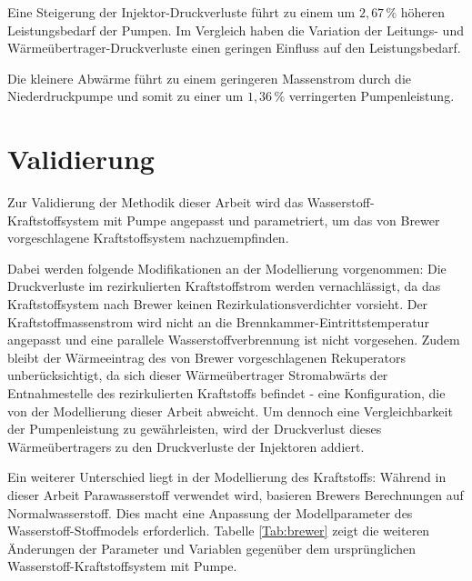 Eine Steigerung der Injektor-Druckverluste führt zu einem um $2,67\,\%$ höheren Leistungsbedarf der Pumpen. Im Vergleich haben die Variation der Leitungs- und Wärmeübertrager-Druckverluste einen geringen Einfluss auf den Leistungsbedarf. 

Die kleinere Abwärme führt zu einem geringeren Massenstrom durch die Niederdruckpumpe und somit zu einer um $1,36\,\%$ verringerten Pumpenleistung.

\section{Validierung}

Zur Validierung der Methodik dieser Arbeit wird das Wasserstoff-Kraftstoffsystem mit Pumpe angepasst und parametriert, um das von Brewer \cite{Brewer.1991} vorgeschlagene Kraftstoffsystem nachzuempfinden. 

Dabei werden folgende Modifikationen an der Modellierung vorgenommen: Die Druckverluste im rezirkulierten Kraftstoffstrom werden vernachlässigt, da das Kraftstoffsystem nach Brewer keinen Rezirkulationsverdichter vorsieht. Der Kraftstoffmassenstrom wird nicht an die Brennkammer-Eintrittstemperatur angepasst und eine parallele Wasserstoffverbrennung ist nicht vorgesehen. Zudem bleibt der Wärmeeintrag des von Brewer vorgeschlagenen Rekuperators unberücksichtigt, da sich dieser Wärmeübertrager Stromabwärts der Entnahmestelle des rezirkulierten Kraftstoffs befindet - eine Konfiguration, die von der Modellierung dieser Arbeit abweicht. Um dennoch eine Vergleichbarkeit der Pumpenleistung zu gewährleisten, wird der Druckverlust dieses Wärmeübertragers zu den Druckverluste der Injektoren addiert. 

Ein weiterer Unterschied liegt in der Modellierung des Kraftstoffs: Während in dieser Arbeit Parawasserstoff verwendet wird, basieren Brewers Berechnungen auf Normalwasserstoff. Dies macht eine Anpassung der Modellparameter des Wasserstoff-Stoffmodels erforderlich. Tabelle \ref{Tab:brewer} zeigt die weiteren Änderungen der Parameter und Variablen gegenüber dem ursprünglichen Wasserstoff-Kraftstoffsystem mit Pumpe.

